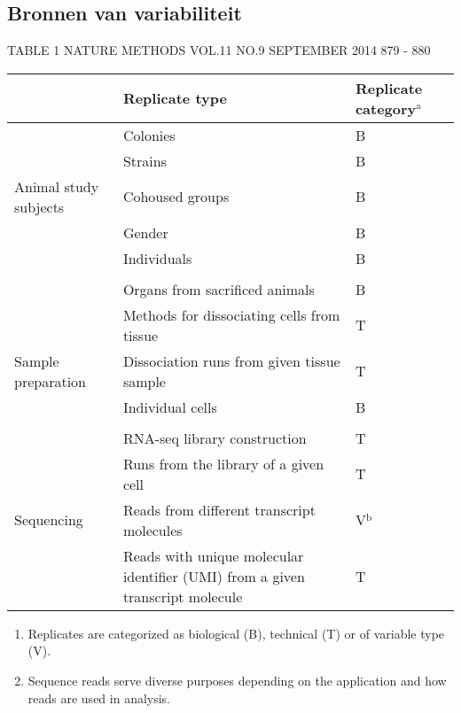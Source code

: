 \documentclass[
]{article}
\providecommand{\tightlist}{%
  \setlength{\itemsep}{0pt}\setlength{\parskip}{0pt}}
\begin{document}
\hypertarget{bronnen-van-variabiliteit}{%
\subsection{Bronnen van variabiliteit}\label{bronnen-van-variabiliteit}}

TABLE 1 NATURE METHODS \textbar{} VOL.11 NO.9 \textbar{} SEPTEMBER 2014
\textbar{} 879 - 880

\begin{longtable}[]{@{}
  >{\centering\arraybackslash}p{}
  >{\raggedright\arraybackslash}p{}
  >{\centering\arraybackslash}p{}@{}}
\toprule
& Replicate type & Replicate category\(^\text{a}\) \\
\midrule
\endhead
& Colonies & B \\
& Strains & B \\
Animal study subjects & Cohoused groups & B \\
& Gender & B \\
& Individuals & B \\
& & \\
& Organs from sacrificed animals & B \\
& Methods for dissociating cells from tissue & T \\
Sample preparation & Dissociation runs from given tissue sample & T \\
& Individual cells & B \\
& & \\
& RNA-seq library construction & T \\
& Runs from the library of a given cell & T \\
Sequencing & Reads from different transcript molecules &
V\(^\text{b}\) \\
& Reads with unique molecular identifier (UMI) from a given transcript
molecule & T \\
\bottomrule
\end{longtable}

\begin{enumerate}
\def\labelenumi{(\alph{enumi})}
\tightlist
\item
  Replicates are categorized as biological (B), technical (T) or of
  variable type (V).
\item
  Sequence reads serve diverse purposes depending on the application and
  how reads are used in analysis.
\end{enumerate}
\end{document}
